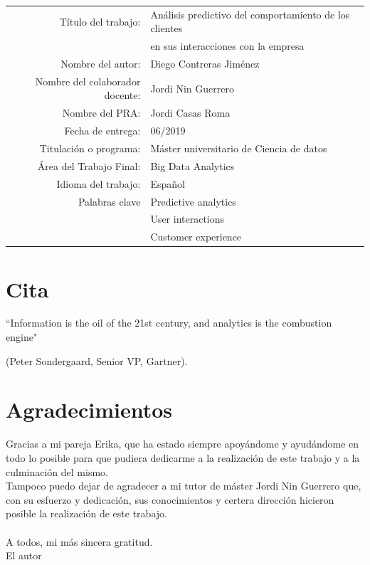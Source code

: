 \begin{table}[ht]
	\centering{}
	\renewcommand{\arraystretch}{2}

	\begin{tabular}{r | l}
		\hline
		Título del trabajo: & Análisis predictivo del comportamiento de los clientes \\ & en sus interacciones con la empresa \\
		\hline
        Nombre del autor: & Diego Contreras Jiménez\\
		\hline
        Nombre del colaborador docente: & Jordi Nin Guerrero\\
		\hline
        Nombre del PRA: & Jordi Casas Roma\\
		\hline
        Fecha de entrega: & 06/2019\\
		\hline
        Titulación o programa: & Máster universitario de Ciencia de datos\\
		\hline
        Área del Trabajo Final: & Big Data Analytics\\
		\hline
        Idioma del trabajo: & Español\\
		\hline
        Palabras clave & Predictive analytics \\ & User interactions \\ & Customer experience\\
		\hline
	\end{tabular}
\end{table}

\chapter*{Cita}

``Information is the oil of the 21st century, and analytics is the combustion engine" 

(Peter Sondergaard, Senior VP, Gartner).

\chapter*{Agradecimientos}

Gracias a mi pareja Erika, que ha estado siempre apoyándome y ayudándome en todo lo posible para que pudiera dedicarme a la realización de este trabajo y a la culminación del mismo.
\\
Tampoco puedo dejar de agradecer a mi tutor de máster Jordi Nin Guerrero que, con su esfuerzo y dedicación, sus conocimientos y certera dirección hicieron posible la realización de este trabajo.
\\
\\
A todos, mi más sincera gratitud.
\\
El autor



